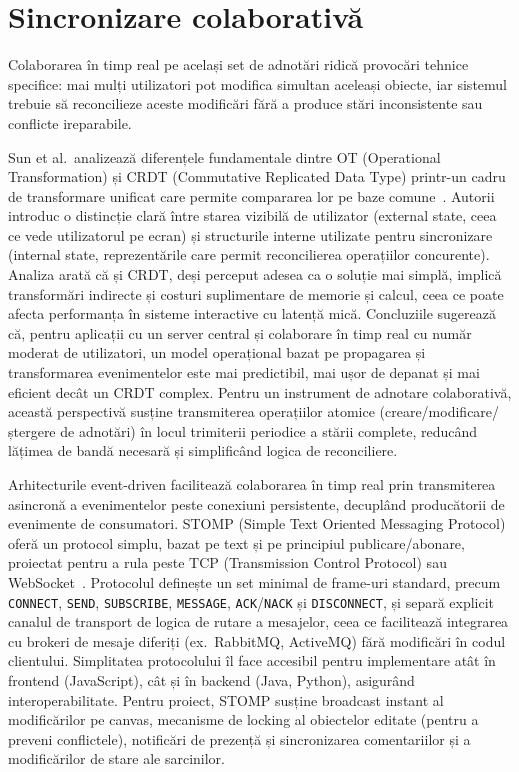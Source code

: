 \section{Sincronizare colaborativă}

Colaborarea în timp real pe același set de adnotări ridică provocări tehnice specifice: mai mulți utilizatori pot modifica simultan aceleași obiecte, iar sistemul trebuie să reconcilieze aceste modificări fără a produce stări inconsistente sau conflicte ireparabile.

Sun et al.\ analizează diferențele fundamentale dintre OT (Operational Transformation) și CRDT (Commutative Replicated Data Type) printr-un cadru de transformare unificat care permite compararea lor pe baze comune~\cite{Sun2020OTCRDT}. Autorii introduc o distincție clară între starea vizibilă de utilizator (external state, ceea ce vede utilizatorul pe ecran) și structurile interne utilizate pentru sincronizare (internal state, reprezentările care permit reconcilierea operațiilor concurente). Analiza arată că și CRDT, deși perceput adesea ca o soluție mai simplă, implică transformări indirecte și costuri suplimentare de memorie și calcul, ceea ce poate afecta performanța în sisteme interactive cu latență mică. Concluziile sugerează că, pentru aplicații cu un server central și colaborare în timp real cu număr moderat de utilizatori, un model operațional bazat pe propagarea și transformarea evenimentelor este mai predictibil, mai ușor de depanat și mai eficient decât un CRDT complex. Pentru un instrument de adnotare colaborativă, această perspectivă susține transmiterea operațiilor atomice (creare/modificare/ștergere de adnotări) în locul trimiterii periodice a stării complete, reducând lățimea de bandă necesară și simplificând logica de reconciliere.

Arhitecturile event-driven facilitează colaborarea în timp real prin transmiterea asincronă a evenimentelor peste conexiuni persistente, decuplând producătorii de evenimente de consumatori. STOMP (Simple Text Oriented Messaging Protocol) oferă un protocol simplu, bazat pe text și pe principiul publicare/abonare, proiectat pentru a rula peste TCP (Transmission Control Protocol) sau WebSocket~\cite{stomp_spec_1_2}. Protocolul definește un set minimal de frame-uri standard, precum \texttt{CONNECT}, \texttt{SEND}, \texttt{SUBSCRIBE}, \texttt{MESSAGE}, \texttt{ACK}/\texttt{NACK} și \texttt{DISCONNECT}, și separă explicit canalul de transport de logica de rutare a mesajelor, ceea ce facilitează integrarea cu brokeri de mesaje diferiți (ex.\ RabbitMQ, ActiveMQ) fără modificări în codul clientului. Simplitatea protocolului îl face accesibil pentru implementare atât în frontend (JavaScript), cât și în backend (Java, Python), asigurând interoperabilitate. Pentru proiect, STOMP susține broadcast instant al modificărilor pe canvas, mecanisme de locking al obiectelor editate (pentru a preveni conflictele), notificări de prezență și sincronizarea comentariilor și a modificărilor de stare ale sarcinilor.

